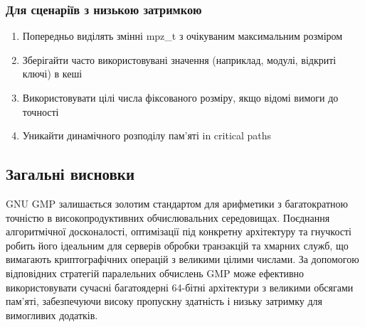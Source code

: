 \subsubsection{Для сценаріїв з низькою затримкою}
\begin{enumerate}
    \item Попередньо виділять змінні mpz\_t з очікуваним максимальним розміром
    \item Зберігайти часто використовувані значення (наприклад, модулі, відкриті ключі) в кеші
    \item Використовувати цілі числа фіксованого розміру, якщо відомі вимоги до точності
    \item Уникайти динамічного розподілу пам'яті in critical paths
\end{enumerate}

\subsection{Загальні висновки}
GNU GMP залишається золотим стандартом для арифметики з багатократною точністю в високопродуктивних обчислювальних 
середовищах. Поєднання алгоритмічної досконалості, оптимізації під конкретну архітектуру та гнучкості робить його 
ідеальним для серверів обробки транзакцій та хмарних служб, що вимагають криптографічних операцій з великими цілими 
числами. За допомогою відповідних стратегій паралельних обчислень GMP може ефективно використовувати сучасні багатоядерні 
64-бітні архітектури з великими обсягами пам'яті, забезпечуючи високу пропускну здатність і низьку затримку для вимогливих 
додатків.
